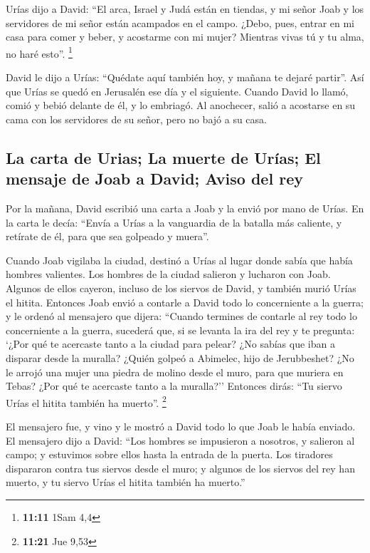 \begin{paracol}{2}
 Urías dijo a David: ``El arca, Israel y Judá están en
tiendas, y mi señor Joab y los servidores de mi señor están acampados en
el campo. ¿Debo, pues, entrar en mi casa para comer y beber, y acostarme
con mi mujer? Mientras vivas tú y tu alma, no haré esto''. \footnote{\textbf{11:11}
  1Sam 4,4}

 David le dijo a Urías: ``Quédate aquí también hoy, y
mañana te dejaré partir''. Así que Urías se quedó en Jerusalén ese día y
el siguiente.  Cuando David lo llamó, comió y bebió
delante de él, y lo embriagó. Al anochecer, salió a acostarse en su cama
con los servidores de su señor, pero no bajó a su casa.

\hypertarget{la-carta-de-urias-la-muerte-de-uruxedas-el-mensaje-de-joab-a-david-aviso-del-rey}{%
\subsection{La carta de Urias; La muerte de Urías; El mensaje de Joab a
David; Aviso del
rey}\label{la-carta-de-urias-la-muerte-de-uruxedas-el-mensaje-de-joab-a-david-aviso-del-rey}}

 Por la mañana, David escribió una carta a Joab y la
envió por mano de Urías.  En la carta le decía: ``Envía a
Urías a la vanguardia de la batalla más caliente, y retírate de él, para
que sea golpeado y muera''.

 Cuando Joab vigilaba la ciudad, destinó a Urías al lugar
donde sabía que había hombres valientes.  Los hombres de
la ciudad salieron y lucharon con Joab. Algunos de ellos cayeron,
incluso de los siervos de David, y también murió Urías el hitita.
 Entonces Joab envió a contarle a David todo lo
concerniente a la guerra;  y le ordenó al mensajero que
dijera: ``Cuando termines de contarle al rey todo lo concerniente a la
guerra,  sucederá que, si se levanta la ira del rey y te
pregunta: `¿Por qué te acercaste tanto a la ciudad para pelear? ¿No
sabías que iban a disparar desde la muralla?  ¿Quién
golpeó a Abimelec, hijo de Jerubbeshet? ¿No le arrojó una mujer una
piedra de molino desde el muro, para que muriera en Tebas? ¿Por qué te
acercaste tanto a la muralla?'' Entonces dirás: ``Tu siervo Urías el
hitita también ha muerto''. \footnote{\textbf{11:21} Jue 9,53}

 El mensajero fue, y vino y le mostró a David todo lo que
Joab le había enviado.  El mensajero dijo a David: ``Los
hombres se impusieron a nosotros, y salieron al campo; y estuvimos sobre
ellos hasta la entrada de la puerta.  Los tiradores
dispararon contra tus siervos desde el muro; y algunos de los siervos
del rey han muerto, y tu siervo Urías el hitita también ha muerto.''


\end{paracol}
